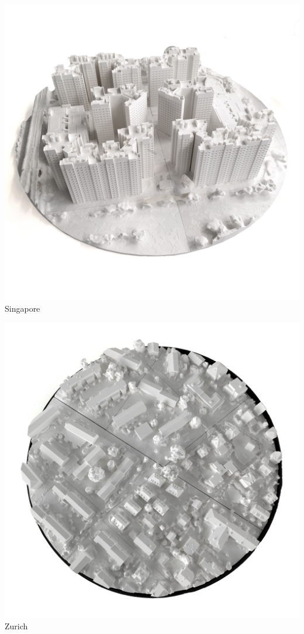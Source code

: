 \documentclass[a4paper,9pt]{article}
\begin{document}
    \begin{minipage}{0.48\linewidth}
        \centering
        \includegraphics[width=.7\linewidth]{Images/modSG_1.jpg}
       \\{Singapore}
         \label{modelp sg}
    \end{minipage}
    \hfill
    \begin{minipage}{0.48\linewidth}
         \centering
        \includegraphics[width=.85\linewidth]{Images/modZH_1.jpg}
       \\{Zurich}
        \label{modelp zh}
    \end{minipage}
\end{document}
